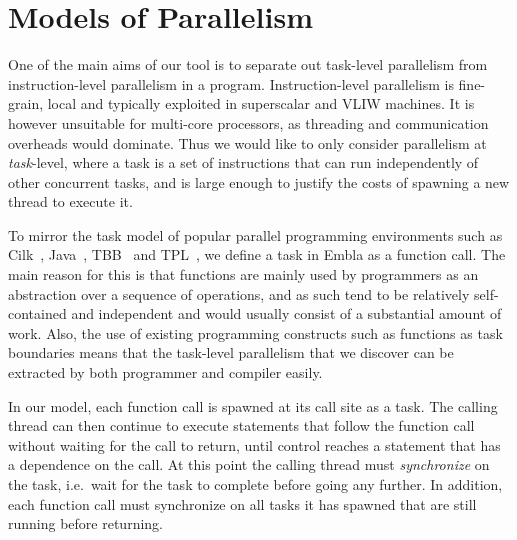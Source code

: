 \section{Models of Parallelism} \label{smethod}

One of the main aims of our tool is to separate out task-level parallelism from instruction-level parallelism in a program.
Instruction-level parallelism is fine-grain, local and typically exploited in superscalar and VLIW machines.
It is however unsuitable for multi-core processors, as threading and communication overheads would dominate.
Thus we would like to only consider parallelism at \emph{task}-level, where a task is a set of instructions that can run independently of other concurrent tasks, and is large enough to justify the costs of spawning a new thread to execute it.

To mirror the task model of popular parallel programming environments such as Cilk~\cite{blumofe96cilk}, Java~\cite{lea00java}, TBB~\cite{reinders07intel} and TPL~\cite{leijen07parallel}, we define a task in Embla as a function call.
The main reason for this is that functions are mainly used by programmers as an abstraction over a sequence of operations, and as such tend to be relatively self-contained and independent and would usually consist of a substantial amount of work.
Also, the use of existing programming constructs such as functions as task boundaries means that the task-level parallelism that we discover can be extracted by both programmer and compiler easily.

In our model, each function call is spawned at its call site as a task.
The calling thread can then continue to execute statements that follow the function call without waiting for the call to return, until control reaches a statement that has a dependence on the call.
At this point the calling thread must \emph{synchronize} on the task, i.e.\ wait for the task to complete before going any further.
In addition, each function call must synchronize on all tasks it has spawned that are still running before returning.

